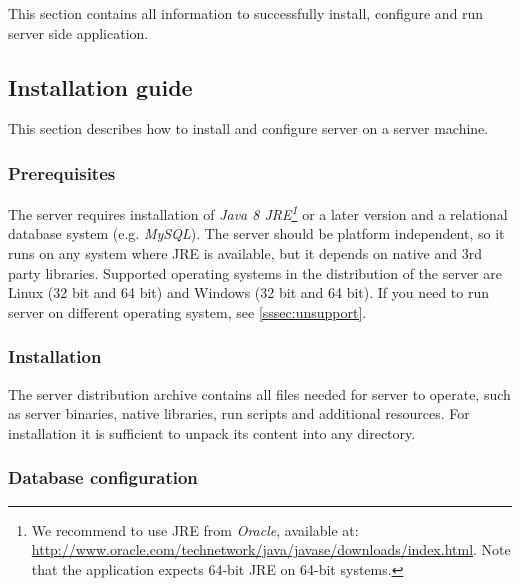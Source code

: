 
This section contains all information to successfully install, configure and run
\textan{} server side application.

\subsection{Installation guide}

This section describes how to install and configure \textan{} server on a server
machine.

\subsubsection{Prerequisites}
\label{sssec:SerInstPre}

The \textan{} server requires installation of \emph{Java 8 JRE\footnote{We
recommend to use JRE from \emph{Oracle}, available at:
\url{http://www.oracle.com/technetwork/java/javase/downloads/index.html}.
Note that the application expects 64-bit JRE on 64-bit systems.}}
or a later version and a relational database system (e.g. \emph{MySQL}).
The server should be platform independent, so it runs on any system where JRE
is available, but it depends on native and 3rd party libraries. Supported operating
systems in the distribution of the \textan{} server are Linux (32 bit and 64 bit)
and Windows (32 bit and 64 bit).  If you need to run \textan{} server on
different operating system, see \ref{sssec:unsupport}.

\subsubsection{Installation}

The \textan{} server distribution archive contains all files needed for \textan{} server to operate,
such as server binaries, native libraries, run scripts and additional resources.
For installation it is sufficient to unpack its content into any directory.

\subsubsection{Database configuration}

